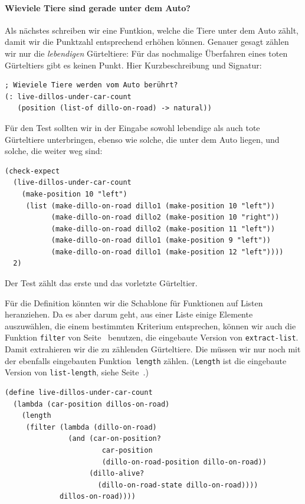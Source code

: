\paragraph{Wieviele Tiere sind gerade unter dem Auto?} Als nächstes
schreiben wir eine Funtkion, welche die Tiere unter dem Auto zählt,
damit wir die Punktzahl entsprechend erhöhen können.  Genauer gesagt
zählen wir nur die \emph{lebendigen} Gürteltiere: Für das nochmalige
Überfahren eines toten Gürteltiers gibt es keinen Punkt.  Hier
Kurzbeschreibung und Signatur:
%
\begin{lstlisting}
; Wieviele Tiere werden vom Auto berührt?
(: live-dillos-under-car-count 
   (position (list-of dillo-on-road) -> natural))
\end{lstlisting}
%
Für den Test sollten wir in der Eingabe sowohl lebendige als auch
tote Gürteltiere unterbringen, ebenso wie solche, die unter dem Auto
liegen, und solche, die weiter weg sind:
%
\begin{lstlisting}
(check-expect
  (live-dillos-under-car-count
    (make-position 10 "left")
     (list (make-dillo-on-road dillo1 (make-position 10 "left"))
           (make-dillo-on-road dillo2 (make-position 10 "right"))
           (make-dillo-on-road dillo2 (make-position 11 "left"))
           (make-dillo-on-road dillo1 (make-position 9 "left"))
           (make-dillo-on-road dillo1 (make-position 12 "left"))))
  2)
\end{lstlisting}
%
Der Test zählt das erste und das vorletzte Gürteltier.

Für die Definition könnten wir die Schablone für Funktionen auf Listen
heranziehen.  Da es aber darum geht, aus einer Liste einige Elemente
auszuwählen, die einem bestimmten Kriterium entsprechen, können wir
auch die Funktion \lstinline{filter} von Seite~\pageref{func:filter}
benutzen, die eingebaute Version von \lstinline{extract-list}.  Damit
extrahieren wir die zu zählenden Gürteltiere.  Die müssen wir nur noch
mit der ebenfalls eingebauten Funktion~\lstinline{length}
zählen. (\lstinline{Length} ist die eingebaute Version von
\lstinline{list-length}, siehe Seite~\pageref{func:length}.)
%
\begin{lstlisting}
(define live-dillos-under-car-count
  (lambda (car-position dillos-on-road)
    (length
     (filter (lambda (dillo-on-road)
               (and (car-on-position?
                       car-position
                       (dillo-on-road-position dillo-on-road))
                    (dillo-alive? 
                      (dillo-on-road-state dillo-on-road))))
             dillos-on-road))))
\end{lstlisting}

